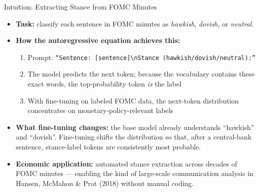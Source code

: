 \begin{frame}{Intuition: Extracting Stance from FOMC Minutes}
\begin{itemize}
\item \textbf{Task:} classify each sentence in FOMC minutes as \emph{hawkish}, \emph{dovish}, or \emph{neutral}.

\medskip
\item \textbf{How the autoregressive equation achieves this:}
\begin{enumerate}
    \item Prompt: \texttt{``Sentence: [sentence]\textbackslash nStance (hawkish/dovish/neutral):''}
    \item The model predicts the next token; because the vocabulary contains these exact words, the top-probability token \emph{is} the label
    \item With fine-tuning on labeled FOMC data, the next-token distribution concentrates on monetary-policy-relevant labels
\end{enumerate}

\medskip
\item \textbf{What fine-tuning changes:} the base model already understands ``hawkish'' and ``dovish''. Fine-tuning shifts the distribution so that, after a central-bank sentence, stance-label tokens are consistently most probable.

\medskip
\item \textbf{Economic application:} automated stance extraction across decades of FOMC minutes --- enabling the kind of large-scale communication analysis in Hansen, McMahon \& Prat (2018) without manual coding.
\end{itemize}
\end{frame}

